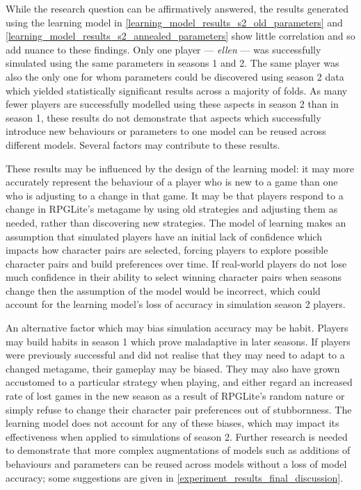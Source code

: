 While the research question can be affirmatively answered, the results generated
using the learning model in \cref{learning_model_results_s2_old_parameters} and
\cref{learning_model_results_s2_annealed_parameters} show little correlation and
so add nuance to these findings. Only one player --- \emph{ellen} --- was
successfully simulated using the same parameters in seasons 1 and 2. The same
player was also the only one for whom parameters could be discovered using
season 2 data which yielded statistically significant results across a majority
of folds. As many fewer players are successfully modelled using these aspects in
season 2 than in season 1, these results do not demonstrate that aspects which
successfully introduce new behaviours or parameters to one model can be reused
across different models. Several factors may contribute to these results.

These results may be influenced by the design of the learning model: it may more
accurately represent the behaviour of a player who is new to a game than one who
is adjusting to a change in that game. It may be that players respond to a
change in RPGLite's metagame by using old strategies and adjusting them as
needed, rather than discovering new strategies. The model of learning makes an
assumption that simulated players have an initial lack of confidence which
impacts how character pairs are selected, forcing players to explore possible
character pairs and build preferences over time. If real-world players do not
lose much confidence in their ability to select winning character pairs when
seasons change then the assumption of the model would be incorrect, which could
account for the learning model's loss of accuracy in simulation season 2
players.

An alternative factor which may bias simulation accuracy may be habit. Players
may build habits in season 1 which prove maladaptive in later seasons. If
players were previously successful and did not realise that they may need to
adapt to a changed metagame, their gameplay may be biased. They may also have
grown accustomed to a particular strategy when playing, and either regard an
increased rate of lost games in the new season as a result of RPGLite's random
nature or simply refuse to change their character pair preferences out of
stubbornness. The learning model does not account for any of these biases, which
may impact its effectiveness when applied to simulations of season 2. Further
research is needed to demonstrate that more complex augmentations of models such
as additions of behaviours and parameters can be reused across models without a
loss of model accuracy; some suggestions are given in
\cref{experiment_results_final_discussion}.

